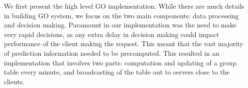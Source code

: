 \begin{figure}[t!]
\centering
{}
\label{fig:perf-impr}
\end{figure}



\label{sec:impl}
We first present the high level GO implementation. While there are much details in building GO system, we focus on the two main components: data processing and decision making. Paramount in our implementation was the need to make very rapid decisions, as any extra delay in decision making could impact performance of the client making the request. This meant that the vast majority of prediction information needed to be precomputed. This resulted in an implementation that involves two parts: computation and updating of a group table every minute, and broadcasting of the table out to servers close to the clients.

